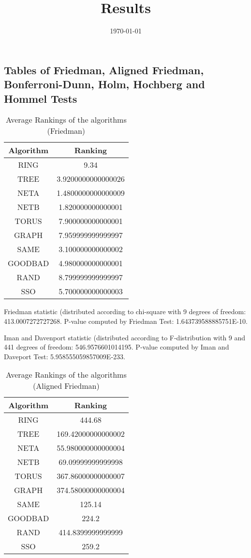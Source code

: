 \documentclass[a4paper,10pt]{article}
\title{Results}
\author{}
\date{\today}
\begin{document}
\begin{landscape}
\oddsidemargin 0in \topmargin 0in\maketitle
\section{Tables of Friedman, Aligned Friedman, Bonferroni-Dunn, Holm, Hochberg and Hommel Tests}
\begin{table}[!htp]
\centering
\caption{Average Rankings of the algorithms (Friedman)
}\begin{tabular}{c|c}
Algorithm&Ranking\\
\hline
 RING&9.34\\
 TREE&3.9200000000000026\\
 NETA&1.4800000000000009\\
 NETB&1.820000000000001\\
 TORUS&7.900000000000001\\
 GRAPH&7.959999999999997\\
 SAME&3.100000000000002\\
 GOODBAD&4.980000000000001\\
 RAND&8.799999999999997\\
 SSO&5.700000000000003\\
\end{tabular}
\end{table}


Friedman statistic (distributed according to chi-square with 9 degrees of freedom: 413.0007272727268. 
P-value computed by Friedman Test: 1.643739588885751E-10.\newline

Iman and Davenport statistic (distributed according to F-distribution with 9 and 441 degrees of freedom: 546.9576601014195. 
P-value computed by Iman and Daveport Test: 5.958555059857009E-233.\newline


\newpage

\begin{table}[!htp]
\centering
\caption{Average Rankings of the algorithms (Aligned Friedman)
}\begin{tabular}{c|c}
Algorithm&Ranking\\
\hline
 RING&444.68\\
 TREE&169.42000000000002\\
 NETA&55.980000000000004\\
 NETB&69.09999999999998\\
 TORUS&367.86000000000007\\
 GRAPH&374.58000000000004\\
 SAME&125.14\\
 GOODBAD&224.2\\
 RAND&414.8399999999999\\
 SSO&259.2\\
\end{tabular}
\end{table}



\end{landscape}
\end{document}

